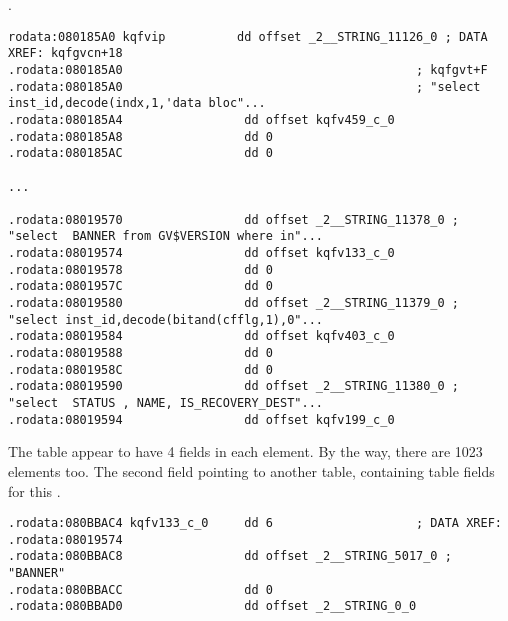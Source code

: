 .\begin{lstlisting}[caption=kqf.o]
rodata:080185A0 kqfvip          dd offset _2__STRING_11126_0 ; DATA XREF: kqfgvcn+18
.rodata:080185A0                                         ; kqfgvt+F
.rodata:080185A0                                         ; "select inst_id,decode(indx,1,'data bloc"...
.rodata:080185A4                 dd offset kqfv459_c_0
.rodata:080185A8                 dd 0
.rodata:080185AC                 dd 0

...

.rodata:08019570                 dd offset _2__STRING_11378_0 ; "select  BANNER from GV$VERSION where in"...
.rodata:08019574                 dd offset kqfv133_c_0
.rodata:08019578                 dd 0
.rodata:0801957C                 dd 0
.rodata:08019580                 dd offset _2__STRING_11379_0 ; "select inst_id,decode(bitand(cfflg,1),0"...
.rodata:08019584                 dd offset kqfv403_c_0
.rodata:08019588                 dd 0
.rodata:0801958C                 dd 0
.rodata:08019590                 dd offset _2__STRING_11380_0 ; "select  STATUS , NAME, IS_RECOVERY_DEST"...
.rodata:08019594                 dd offset kqfv199_c_0
\end{lstlisting}

{The table appear to have 4 fields in each element. By the way, there are 1023 elements too.}
{The second field pointing to another table, containing table fields for this .}

\begin{lstlisting}[caption=kqf.o]
.rodata:080BBAC4 kqfv133_c_0     dd 6                    ; DATA XREF: .rodata:08019574
.rodata:080BBAC8                 dd offset _2__STRING_5017_0 ; "BANNER"
.rodata:080BBACC                 dd 0
.rodata:080BBAD0                 dd offset _2__STRING_0_0
\end{lstlisting}


